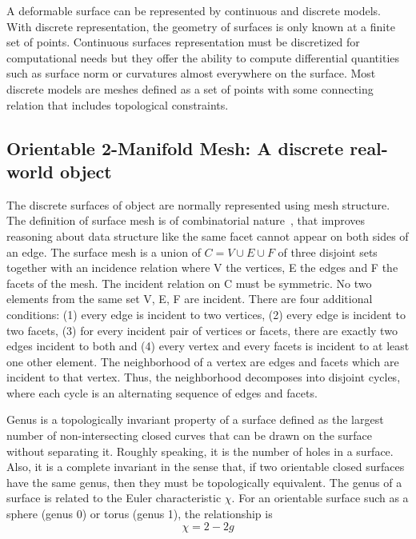 \documentclass{InsightArticle}
\begin{document}
A deformable surface can be represented by continuous and discrete models. With discrete representation, the geometry of surfaces is only known at a finite set of points. Continuous surfaces representation must be discretized for computational needs but they offer the ability to compute differential quantities such as surface norm or curvatures almost everywhere on the surface. Most discrete models are meshes defined as a set of points with some connecting relation that includes topological constraints. 
\subsection{Orientable 2-Manifold Mesh: A discrete real-world object}
The discrete surfaces of object are normally represented using mesh structure. The definition of surface mesh is of combinatorial nature~\cite{Kettner1999}, that improves reasoning about data structure like the same facet cannot appear on both sides of an edge. The surface mesh is a union of $C = V \cup E \cup F$ of three disjoint sets together with an incidence relation where V the vertices, E the edges and F the facets of the mesh. The incident relation on C must be symmetric. No two elements from the same set V, E, F are incident. There are four additional conditions: (1) every edge is incident to two vertices, (2) every edge is incident to two facets, (3) for every incident pair of vertices or facets, there are exactly two edges incident to both and (4) every vertex and every facets is incident to at least one other element. The neighborhood of a vertex are edges and facets which are incident to that vertex. Thus, the neighborhood decomposes into disjoint cycles, where each cycle is an alternating sequence of edges and facets.

Genus is a topologically invariant property of a surface defined as the largest number of non-intersecting closed curves that can be drawn on the surface without separating it. Roughly speaking, it is the number of holes in a surface. Also, it is a complete invariant in the sense that, if two orientable closed surfaces have the same genus, then they must be topologically equivalent. The genus of a surface is related to the Euler characteristic $\chi$. For an orientable surface such as a sphere (genus 0) or torus (genus 1), the relationship is
\begin{equation}
\chi = 2 - 2g
\end{equation}
\end{document}
